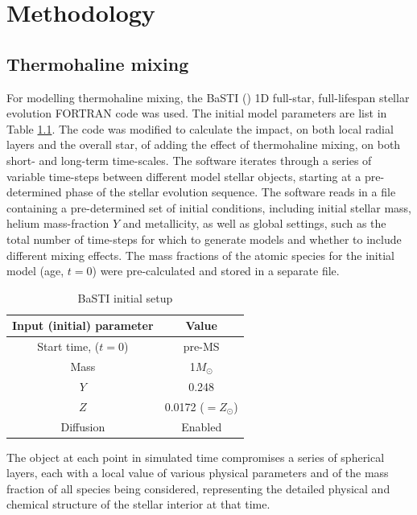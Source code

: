 \documentclass[12pt, a4paper]{report}
\begin{document}
\chapter{Methodology} \label{Methodology}
\section{Thermohaline mixing}

For modelling thermohaline mixing, the BaSTI (\cite{2004ApJ...612..168P}) 1D full-star, full-lifespan stellar evolution FORTRAN code was used. The initial model parameters are list in Table \ref{basti_params}. The code was modified to calculate the impact, on both local radial layers and the overall star, of adding the effect of thermohaline mixing, on both short- and long-term time-scales. The software iterates through a series of variable time-steps between different model stellar objects, starting at a pre-determined phase of the stellar evolution sequence. The software reads in a file containing a pre-determined set of initial conditions, including initial stellar mass, helium mass-fraction $Y$ and metallicity, as well as global settings, such as the total number of time-steps for which to generate models and whether to include different mixing effects. The mass fractions of the atomic species for the initial model (age, $t = 0$) were pre-calculated and stored in a separate file.

\begin{table}
\begin{center}
\begin{tabular}{cc}
\hline
Input (initial) parameter & Value \\
\hline
Start time, ($t=0$) & pre-MS \\
Mass & 1$M_{\odot}$ \\
$Y$ & 0.248 \\
$Z$ & 0.0172 ($=Z_{\odot}$) \\
Diffusion & Enabled \\
\hline
\end{tabular}
\caption{BaSTI initial setup}
\label{basti_params}
\end{center}
\end{table}

The object at each point in simulated time compromises a series of spherical layers, each with a local value of various physical parameters and of the mass fraction of all species being considered, representing the detailed physical and chemical structure of the stellar interior at that time.
\end{document}
